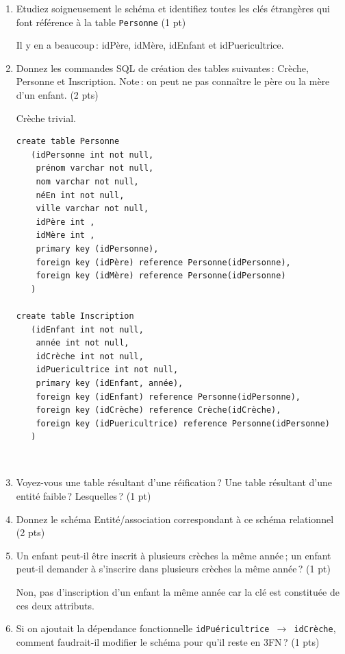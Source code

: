 \begin{enumerate}
  \item Etudiez soigneusement le schéma et identifiez toutes les clés étrangères
      qui font référence à la table \texttt{Personne} (1 pt)
     
     
\begin{solution}
Il y en a beaucoup\,: idPère, idMère, idEnfant et idPuericultrice.
\end{solution}
 
  \item Donnez les commandes SQL de création des tables suivantes\,: 
  Crèche, Personne et Inscription. Note\,: on peut ne pas connaître
  le père ou la mère d'un enfant. (2 pts)
  
  
\begin{solution}
Crèche\: trivial.

\smallskip

\begin{small}
\begin{verbatim}
create table Personne 
   (idPersonne int not null,
    prénom varchar not null,
    nom varchar not null,
    néEn int not null,
    ville varchar not null,
    idPère int ,
    idMère int ,
    primary key (idPersonne),
    foreign key (idPère) reference Personne(idPersonne),
    foreign key (idMère) reference Personne(idPersonne)
   )

create table Inscription 
   (idEnfant int not null,
    année int not null,
    idCrèche int not null,
    idPuericultrice int not null,
    primary key (idEnfant, année),
    foreign key (idEnfant) reference Personne(idPersonne),
    foreign key (idCrèche) reference Crèche(idCrèche),
    foreign key (idPuericultrice) reference Personne(idPersonne)
   )
\end{verbatim}
\
\end{small}
\end{solution}
  
  \item Voyez-vous une table résultant d'une réification\,? Une table résultant d'une entité faible\,? 
     Lesquelles\,? (1 pt)
     
  \item Donnez le schéma Entité/association correspondant à ce schéma relationnel (2 pts)
  
  \item Un enfant peut-il être inscrit à plusieurs crèches la même année\,; un enfant peut-il demander
      à s'inscrire dans plusieurs crèches la même année\,? (1 pt)
      
\begin{solution}
    Non, pas d'inscription d'un enfant la même année car la clé est constituée de ces deux attributs.
\end{solution}


    \item Si on ajoutait la dépendance fonctionnelle \texttt{idPuéricultrice $\to$ idCrèche},
        comment faudrait-il modifier le schéma pour qu'il reste en 3FN\,? (1 pts)
      
  
\end{enumerate}

